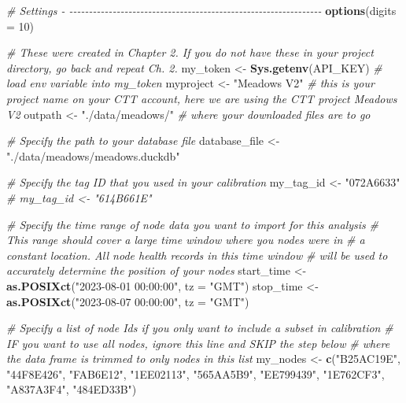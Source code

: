 \documentclass[
]{book}
\newenvironment{Shaded}{\begin{snugshade}}{\end{snugshade}}
\newcommand{\AttributeTok}[1]{\textcolor[rgb]{0.13,0.29,0.53}{#1}}
\newcommand{\CommentTok}[1]{\textcolor[rgb]{0.56,0.35,0.01}{\textit{#1}}}
\newcommand{\DecValTok}[1]{\textcolor[rgb]{0.00,0.00,0.81}{#1}}
\newcommand{\FunctionTok}[1]{\textcolor[rgb]{0.13,0.29,0.53}{\textbf{#1}}}
\newcommand{\NormalTok}[1]{#1}
\newcommand{\OtherTok}[1]{\textcolor[rgb]{0.56,0.35,0.01}{#1}}
\newcommand{\StringTok}[1]{\textcolor[rgb]{0.31,0.60,0.02}{#1}}
\begin{document}
\begin{Shaded}
\begin{Highlighting}[]
\CommentTok{\# Settings {-} {-}{-}{-}{-}{-}{-}{-}{-}{-}{-}{-}{-}{-}{-}{-}{-}{-}{-}{-}{-}{-}{-}{-}{-}{-}{-}{-}{-}{-}{-}{-}{-}{-}{-}{-}{-}{-}{-}{-}{-}{-}{-}{-}{-}{-}{-}{-}{-}{-}{-}{-}{-}{-}{-}{-}{-}{-}{-}{-}{-}{-}{-}{-}{-}}
\FunctionTok{options}\NormalTok{(}\AttributeTok{digits =} \DecValTok{10}\NormalTok{)}

\CommentTok{\# These were created in Chapter 2. If you do not have these in your project directory, go back and repeat Ch. 2.}
\NormalTok{my\_token }\OtherTok{\textless{}{-}} \FunctionTok{Sys.getenv}\NormalTok{(}\StringTok{\textquotesingle{}API\_KEY\textquotesingle{}}\NormalTok{) }\CommentTok{\# load env variable into my\_token}
\NormalTok{myproject }\OtherTok{\textless{}{-}} \StringTok{"Meadows V2"} \CommentTok{\# this is your project name on your CTT account, here we are using the CTT project \textquotesingle{}Meadows V2\textquotesingle{}}
\NormalTok{outpath }\OtherTok{\textless{}{-}} \StringTok{"./data/meadows/"} \CommentTok{\# where your downloaded files are to go}

\CommentTok{\# Specify the path to your database file}
\NormalTok{database\_file }\OtherTok{\textless{}{-}} \StringTok{"./data/meadows/meadows.duckdb"}

\CommentTok{\# Specify the tag ID that you used in your calibration}
\NormalTok{my\_tag\_id }\OtherTok{\textless{}{-}} \StringTok{"072A6633"}
\CommentTok{\# my\_tag\_id \textless{}{-} "614B661E"}

\CommentTok{\# Specify the time range of node data you want to import for this analysis}
\CommentTok{\#   This range should cover a large time window where you nodes were in}
\CommentTok{\#   a constant location.  All node health records in this time window}
\CommentTok{\#   will be used to accurately determine the position of your nodes}
\NormalTok{start\_time }\OtherTok{\textless{}{-}} \FunctionTok{as.POSIXct}\NormalTok{(}\StringTok{"2023{-}08{-}01 00:00:00"}\NormalTok{, }\AttributeTok{tz =} \StringTok{"GMT"}\NormalTok{)}
\NormalTok{stop\_time }\OtherTok{\textless{}{-}} \FunctionTok{as.POSIXct}\NormalTok{(}\StringTok{"2023{-}08{-}07 00:00:00"}\NormalTok{, }\AttributeTok{tz =} \StringTok{"GMT"}\NormalTok{)}

\CommentTok{\# Specify a list of node Ids if you only want to include a subset in calibration}
\CommentTok{\# IF you want to use all nodes, ignore this line and SKIP the step below}
\CommentTok{\# where the data frame is trimmed to only nodes in this list}
\NormalTok{my\_nodes }\OtherTok{\textless{}{-}} \FunctionTok{c}\NormalTok{(}\StringTok{"B25AC19E"}\NormalTok{, }\StringTok{"44F8E426"}\NormalTok{, }\StringTok{"FAB6E12"}\NormalTok{, }\StringTok{"1EE02113"}\NormalTok{, }\StringTok{"565AA5B9"}\NormalTok{, }\StringTok{"EE799439"}\NormalTok{, }\StringTok{"1E762CF3"}\NormalTok{, }\StringTok{"A837A3F4"}\NormalTok{, }\StringTok{"484ED33B"}\NormalTok{)}


\end{Highlighting}
\end{Shaded}
\end{document}
